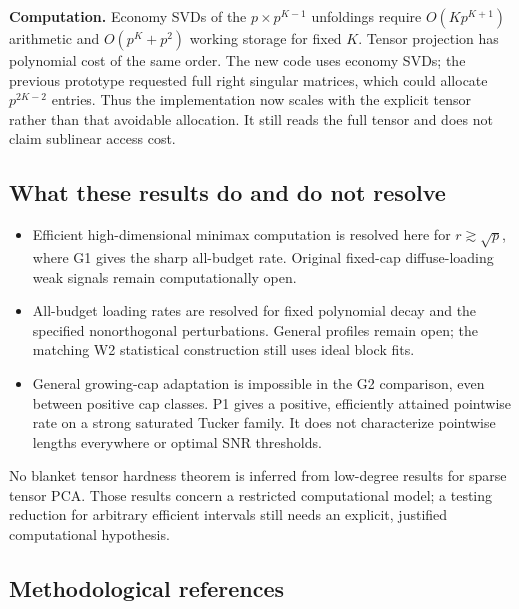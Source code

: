 \documentclass[
  10pt,
]{article}
\providecommand{\tightlist}{%
  \setlength{\itemsep}{0pt}\setlength{\parskip}{0pt}}
\begin{document}
\textbf{Computation.} Economy SVDs of the \(p\times p^{K-1}\) unfoldings
require \(O(Kp^{K+1})\) arithmetic and \(O(p^K+p^2)\) working storage
for fixed \(K\). Tensor projection has polynomial cost of the same
order. The new code uses economy SVDs; the previous prototype requested
full right singular matrices, which could allocate \(p^{2K-2}\) entries.
Thus the implementation now scales with the explicit tensor rather than
that avoidable allocation. It still reads the full tensor and does not
claim sublinear access cost.

\subsection{What these results do and do not
resolve}\label{what-these-results-do-and-do-not-resolve}

\begin{itemize}
\tightlist
\item
  Efficient high-dimensional minimax computation is resolved here for
  \(r\gtrsim\sqrt p\), where G1 gives the sharp all-budget rate.
  Original fixed-cap diffuse-loading weak signals remain computationally
  open.
\item
  All-budget loading rates are resolved for fixed polynomial decay and
  the specified nonorthogonal perturbations. General profiles remain
  open; the matching W2 statistical construction still uses ideal block
  fits.
\item
  General growing-cap adaptation is impossible in the G2 comparison,
  even between positive cap classes. P1 gives a positive, efficiently
  attained pointwise rate on a strong saturated Tucker family. It does
  not characterize pointwise lengths everywhere or optimal SNR
  thresholds.
\end{itemize}

No blanket tensor hardness theorem is inferred from low-degree results
for sparse tensor PCA. Those results concern a restricted computational
model; a testing reduction for arbitrary efficient intervals still needs
an explicit, justified computational hypothesis.

\subsection{Methodological references}\label{methodological-references}
\end{document}
